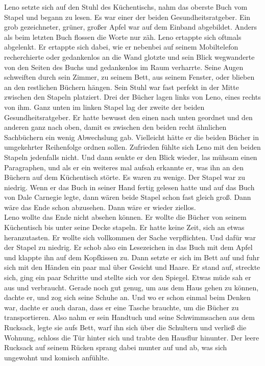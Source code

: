 \documentclass[ngerman,smalldemyvopaper,11pt,oneside,onecolumn,openright,extrafontsizes]{memoir}
\begin{document}
Leno setzte sich auf den Stuhl des Küchentischs, nahm das oberste Buch vom Stapel und begann zu lesen. Es war einer der beiden Gesundheitsratgeber. Ein grob gezeichneter, grüner, großer Apfel war auf dem Einband abgebildet. Anders als beim letzten Buch flossen die Worte nur zäh. Leno ertappte sich oftmals abgelenkt. Er ertappte sich dabei, wie er nebenbei auf seinem Mobiltelefon recherchierte oder gedankenlos an die Wand glotzte und sein Blick wegwanderte von den Seiten des Buchs und gedankenlos im Raum verharrte. Seine Augen schweiften durch sein Zimmer, zu seinem Bett, aus seinem Fenster, oder blieben an den restlichen Büchern hängen. Sein Stuhl war fast perfekt in der Mitte zwischen den Stapeln platziert. Drei der Bücher lagen links von Leno, eines rechts von ihm. Ganz unten im linken Stapel lag der zweite der beiden Gesundheitsratgeber. Er hatte bewusst den einen nach unten geordnet und den anderen ganz nach oben, damit es zwischen den beiden recht ähnlichen Sachbüchern ein wenig Abwechslung gab. Vielleicht hätte er die beiden Bücher in umgekehrter Reihenfolge ordnen sollen. Zufrieden fühlte sich Leno mit den beiden Stapeln jedenfalls nicht. Und dann senkte er den Blick wieder, las mühsam einen Paragraphen, und als er ein weiteres mal aufsah erkannte er, was ihn an den Büchern auf dem Küchentisch störte. Es waren zu wenige. Der Stapel war zu niedrig. Wenn er das Buch in seiner Hand fertig gelesen hatte und auf das Buch von Dale Carnegie legte, dann wären beide Stapel schon fast gleich groß. Dann wäre das Ende schon abzusehen. Dann wäre er wieder ziellos.\\
Leno wollte das Ende nicht absehen können. Er wollte die Bücher von seinem Küchentisch bis unter seine Decke stapeln. Er hatte keine Zeit, sich an etwas heranzutasten. Er wollte sich vollkommen der Sache verpflichten. Und dafür war der Stapel zu niedrig. Er schob also ein Lesezeichen in das Buch mit dem Apfel und klappte ihn auf dem Kopfkissen zu. Dann setzte er sich im Bett auf und fuhr sich mit den Händen ein paar mal über Gesicht und Haare. Er stand auf, streckte sich, ging ein paar Schritte und stellte sich vor den Spiegel. Etwas müde sah er aus und verbraucht. Gerade noch gut genug, um aus dem Haus gehen zu können, dachte er, und zog sich seine Schuhe an. Und wo er schon einmal beim Denken war, dachte er auch daran, dass er eine Tasche brauchte, um die Bücher zu transportieren. Also nahm er sein Handtuch und seine Schwimmsachen aus dem Rucksack, legte sie aufs Bett, warf ihn sich über die Schultern und verließ die Wohnung, schloss die Tür hinter sich und trabte den Hausflur hinunter. Der leere Rucksack auf seinem Rücken sprang dabei munter auf und ab, was sich ungewohnt und komisch anfühlte.\\
\end{document}
